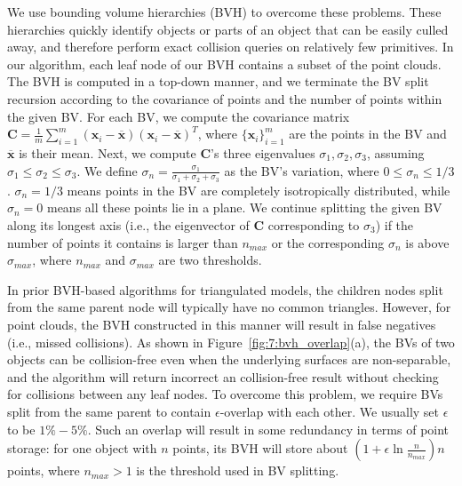 We use bounding volume hierarchies (BVH) to overcome these problems. These hierarchies quickly identify objects or parts of an object that can be easily culled away, and therefore perform exact collision queries on relatively
few primitives.
In our algorithm, each leaf node of our BVH contains a subset of the point clouds. The BVH is computed in a top-down manner, and we terminate the BV split recursion according to
the covariance of points and the number of points within the given BV. For each BV, we compute the covariance matrix $\mathbf C = \frac{1}{m} \sum_{i=1}^{m} (\mathbf x_i - \overline{\mathbf x})(\mathbf x_i - \overline{\mathbf x})^T$, where $\{\mathbf x_i\}_{i=1}^m$ are the points in the BV and $\overline{\mathbf x}$ is their mean.
Next, we compute $\mathbf C$'s three eigenvalues $\sigma_1, \sigma_2, \sigma_3$, assuming $\sigma_1 \leq \sigma_2 \leq \sigma_3$. We define $\sigma_n = \frac{\sigma_1}{\sigma_1 + \sigma_2 + \sigma_3}$ as the BV's variation, where $0 \leq \sigma_n \leq 1/3$. $\sigma_n = 1/3$ means points in the BV are completely isotropically distributed, while $\sigma_n = 0$ means all these points lie in a plane. We continue splitting the given BV along its longest axis (i.e., the eigenvector of $\mathbf C$ corresponding to $\sigma_3$) if the number of points it contains is larger than $n_{max}$ or the corresponding $\sigma_n$ is above $\sigma_{max}$, where $n_{max}$ and $\sigma_{max}$
are two thresholds.

In prior BVH-based algorithms for triangulated models, the children nodes split from the same parent node will typically have no common triangles.
However, for point clouds, the BVH constructed in this manner will result in false negatives (i.e., missed collisions). As shown in Figure~\ref{fig:7:bvh_overlap}(a), the BVs
of two objects can be collision-free even when the underlying surfaces are non-separable, and the algorithm will return incorrect an collision-free result
without checking for collisions between any leaf nodes. To overcome this problem,  we require BVs split from the same parent to contain $\epsilon$-overlap with
each other. We usually set $\epsilon$ to be $1\%- 5\%$. Such an overlap will result in some redundancy in terms of point storage: for one object with $n$ points, its
BVH will store about $(1+\epsilon \ln \frac{n}{n_{max}} ) n$ points, where $n_{max} > 1$ is the threshold used in BV splitting.


